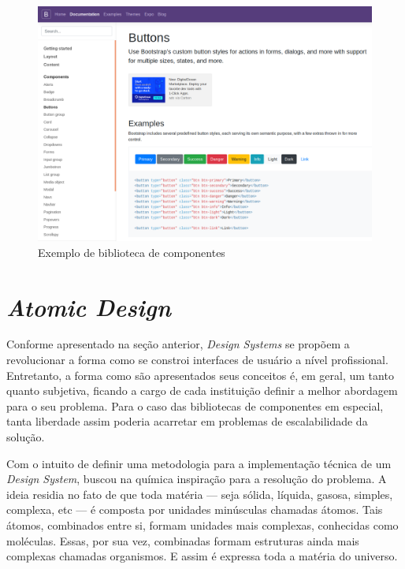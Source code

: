 \begin{figure}
	\includegraphics[width=\linewidth]{./04-figuras/02_referencial_teorico/bootstrap.png}
	\caption{Exemplo de biblioteca de componentes}
  \label{fig:bootstrapStyleGuide}
\end{figure}

\section{\textit{Atomic Design}}
\label{sec:atomicDesign}

Conforme apresentado na seção anterior, \textit{Design Systems} se propõem a revolucionar a forma como se constroi interfaces de usuário a nível profissional. Entretanto, a forma como são apresentados seus conceitos é, em geral, um tanto quanto subjetiva, ficando a cargo de cada instituição definir a melhor abordagem para o seu problema. Para o caso das bibliotecas de componentes em especial, tanta liberdade assim poderia acarretar em problemas de escalabilidade da solução.

Com o intuito de definir uma metodologia para a implementação técnica de um \textit{Design System},  buscou na química inspiração para a resolução do problema. A ideia residia no fato de que toda matéria --- seja sólida, líquida, gasosa, simples, complexa, etc --- é composta por unidades minúsculas chamadas átomos. Tais átomos, combinados entre si, formam unidades mais complexas, conhecidas como moléculas. Essas, por sua vez, combinadas formam estruturas ainda mais complexas chamadas organismos. E assim é expressa toda a matéria do universo.

